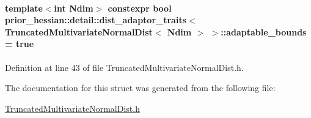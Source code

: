 \paragraph[{\texorpdfstring{adaptable\+\_\+bounds}{adaptable_bounds}}]{\setlength{\rightskip}{0pt plus 5cm}template$<$int Ndim$>$ constexpr bool {\bf prior\+\_\+hessian\+::detail\+::dist\+\_\+adaptor\+\_\+traits}$<$ {\bf Truncated\+Multivariate\+Normal\+Dist}$<$ Ndim $>$ $>$\+::adaptable\+\_\+bounds = true\hspace{0.3cm}{\ttfamily [static]}}\hypertarget{structprior__hessian_1_1detail_1_1dist__adaptor__traits_3_01TruncatedMultivariateNormalDist_3_01Ndim_01_4_01_4_a5a7a73e24a925a4e7696ff7259f855c5}{}\label{structprior__hessian_1_1detail_1_1dist__adaptor__traits_3_01TruncatedMultivariateNormalDist_3_01Ndim_01_4_01_4_a5a7a73e24a925a4e7696ff7259f855c5}


Definition at line 43 of file Truncated\+Multivariate\+Normal\+Dist.\+h.



The documentation for this struct was generated from the following file\+:\begin{DoxyCompactItemize}
\item 
\hyperlink{TruncatedMultivariateNormalDist_8h}{Truncated\+Multivariate\+Normal\+Dist.\+h}\end{DoxyCompactItemize}
